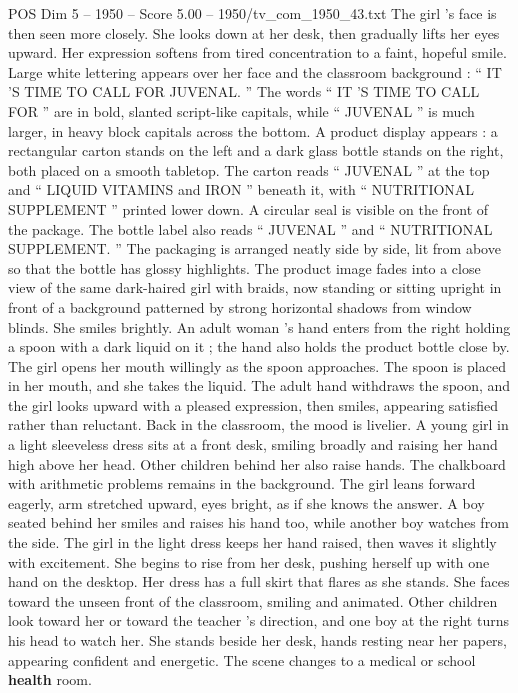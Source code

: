 \begin{textsample}{POS Dim 5 – 1950 – Score 5.00 – 1950/tv\_com\_1950\_43.txt}
The girl ’s face is then seen more closely.
She looks down at her desk, then gradually lifts her eyes upward.
Her expression softens from tired concentration to a faint, hopeful smile.
Large white lettering appears over her face and the classroom background : “ IT ’S TIME TO CALL FOR JUVENAL. ” The words “ IT ’S TIME TO CALL FOR ” are in bold, slanted script-like capitals, while “ JUVENAL ” is much larger, in heavy block capitals across the bottom.
A product display appears : a rectangular carton stands on the left and a dark glass bottle stands on the right, both placed on a smooth tabletop.
The carton reads “ JUVENAL ” at the top and “ LIQUID VITAMINS and IRON ” beneath it, with “ NUTRITIONAL SUPPLEMENT ” printed lower down.
A circular seal is visible on the front of the package.
The bottle label also reads “ JUVENAL ” and “ NUTRITIONAL SUPPLEMENT. ” The packaging is arranged neatly side by side, lit from above so that the bottle has glossy highlights.
The product image fades into a close view of the same dark-haired girl with braids, now standing or sitting upright in front of a background patterned by strong horizontal shadows from window blinds.
She smiles brightly.
An adult woman ’s hand enters from the right holding a spoon with a dark liquid on it ; the hand also holds the product bottle close by.
The girl opens her mouth willingly as the spoon approaches.
The spoon is placed in her mouth, and she takes the liquid.
The adult hand withdraws the spoon, and the girl looks upward with a pleased expression, then smiles, appearing satisfied rather than reluctant.
Back in the classroom, the mood is livelier.
A young girl in a light sleeveless dress sits at a front desk, smiling broadly and raising her hand high above her head.
Other children behind her also raise hands.
The chalkboard with arithmetic problems remains in the background.
The girl leans forward eagerly, arm stretched upward, eyes bright, as if she knows the answer.
A boy seated behind her smiles and raises his hand too, while another boy watches from the side.
The girl in the light dress keeps her hand raised, then waves it slightly with excitement.
She begins to rise from her desk, pushing herself up with one hand on the desktop.
Her dress has a full skirt that flares as she stands.
She faces toward the unseen front of the classroom, smiling and animated.
Other children look toward her or toward the teacher ’s direction, and one boy at the right turns his head to watch her.
She stands beside her desk, hands resting near her papers, appearing confident and energetic.
The scene changes to a medical or school \textbf{health} room.

\end{textsample}
